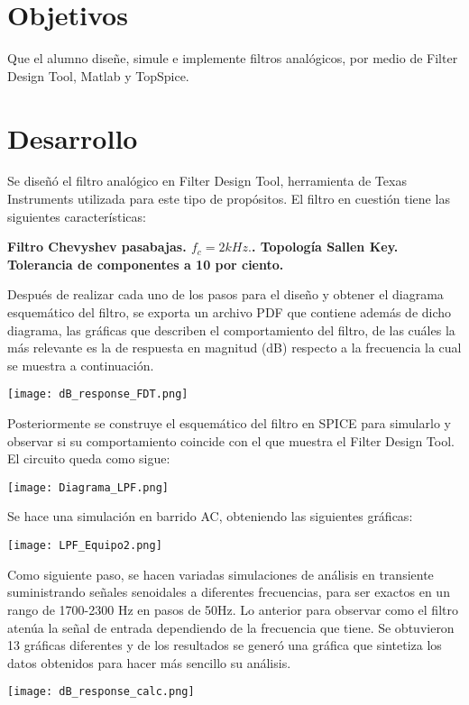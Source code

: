 \documentclass[12pt]{article}
\begin{document}
\section{Objetivos}
Que el alumno diseñe, simule e implemente filtros analógicos, por medio de Filter Design Tool, Matlab y
TopSpice. 
\section{Desarrollo}
Se diseñó el filtro analógico en Filter Design Tool, herramienta de Texas Instruments utilizada para este tipo de propósitos. El filtro en cuestión tiene las siguientes características:
\begin{center}
\textbf{Filtro Chevyshev pasabajas. $f_{c} = 2kHz.$. Topología Sallen Key. Tolerancia de componentes a 10 por ciento.}
\end{center}
Después de realizar cada uno de los pasos para el diseño y obtener el diagrama esquemático del filtro, se exporta un archivo PDF que contiene además de dicho diagrama, las gráficas que describen el comportamiento del filtro, de las cuáles la más relevante es la de respuesta en magnitud (dB) respecto a la frecuencia la cual se muestra a continuación.
\begin{center}
    \centering
    \texttt{[image: dB\_response\_FDT.png]}
\end{center}
Posteriormente se construye el esquemático del filtro en SPICE para simularlo y observar si su comportamiento coincide con el que muestra el Filter Design Tool. El circuito queda como sigue:
\begin{center}
    \centering
    \texttt{[image: Diagrama\_LPF.png]}
\end{center}
Se hace una simulación en barrido AC, obteniendo las siguientes gráficas:
\begin{center}
    \centering
    \texttt{[image: LPF\_Equipo2.png]}
\end{center}
Como siguiente paso, se hacen variadas simulaciones de análisis en transiente suministrando señales senoidales a diferentes frecuencias, para ser exactos en un rango de 1700-2300 Hz en pasos de 50Hz. Lo anterior para observar como el filtro atenúa la señal de entrada dependiendo de la frecuencia que tiene. Se obtuvieron 13 gráficas diferentes y de los resultados se generó una gráfica que sintetiza los datos obtenidos para hacer más sencillo su análisis.
\begin{center}
    \centering
    \texttt{[image: dB\_response\_calc.png]}
\end{center}
\end{document}
